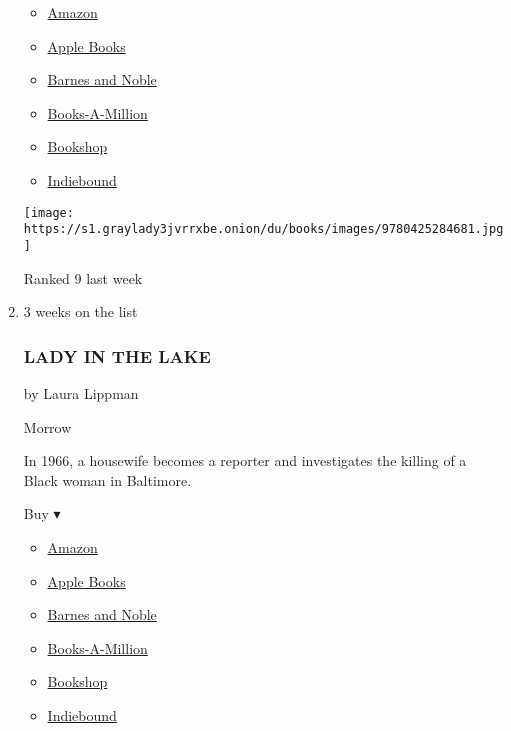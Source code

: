 \begin{enumerate}
  \begin{itemize}
  \tightlist
  \item
    \href{https://www.amazon.com/Before-We-Were-Yours-Novel/dp/0425284689?tag=NYTBS-20}{Amazon}
  \item
    \href{https://du-gae-books-dot-nyt-du-prd.appspot.com/buy?title=BEFORE+WE+WERE+YOURS\&author=Lisa+Wingate}{Apple
    Books}
  \item
    \href{https://www.anrdoezrs.net/click-7990613-11819508?url=https\%3A\%2F\%2Fwww.barnesandnoble.com\%2Fw\%2F\%3Fean\%3D9780425284704}{Barnes
    and Noble}
  \item
    \href{https://www.anrdoezrs.net/click-7990613-35140?url=https\%3A\%2F\%2Fwww.booksamillion.com\%2Fp\%2FBEFORE\%2BWE\%2BWERE\%2BYOURS\%2FLisa\%2BWingate\%2F9780425284704}{Books-A-Million}
  \item
    \href{https://bookshop.org/a/3546/9780425284704}{Bookshop}
  \item
    \href{https://www.indiebound.org/book/9780425284704?aff=NYT}{Indiebound}
  \end{itemize}

  \texttt{[image: https://s1.graylady3jvrrxbe.onion/du/books/images/9780425284681.jpg]}

  Ranked 9 last week
\item
  \href{https://www.nytimes3xbfgragh.onion/2019/07/18/books/review/laura-lippman-lady-in-the-lake.html}{}

  3 weeks on the list

  \hypertarget{lady-in-the-lake}{%
  \subsubsection{LADY IN THE LAKE}\label{lady-in-the-lake}}

  by Laura Lippman

  Morrow

  In 1966, a housewife becomes a reporter and investigates the killing
  of a Black woman in Baltimore.

  Buy ▾

  \begin{itemize}
  \tightlist
  \item
    \href{https://www.amazon.com/Lady-Lake-Novel-Laura-Lippman/dp/0062390015?tag=NYTBS-20}{Amazon}
  \item
    \href{https://du-gae-books-dot-nyt-du-prd.appspot.com/buy?title=LADY+IN+THE+LAKE\&author=Laura+Lippman}{Apple
    Books}
  \item
    \href{https://www.anrdoezrs.net/click-7990613-11819508?url=https\%3A\%2F\%2Fwww.barnesandnoble.com\%2Fw\%2F\%3Fean\%3D9780062390028}{Barnes
    and Noble}
  \item
    \href{https://www.anrdoezrs.net/click-7990613-35140?url=https\%3A\%2F\%2Fwww.booksamillion.com\%2Fp\%2FLADY\%2BIN\%2BTHE\%2BLAKE\%2FLaura\%2BLippman\%2F9780062390028}{Books-A-Million}
  \item
    \href{https://bookshop.org/a/3546/9780062390028}{Bookshop}
  \item
    \href{https://www.indiebound.org/book/9780062390028?aff=NYT}{Indiebound}
  \end{itemize}


\end{enumerate}
